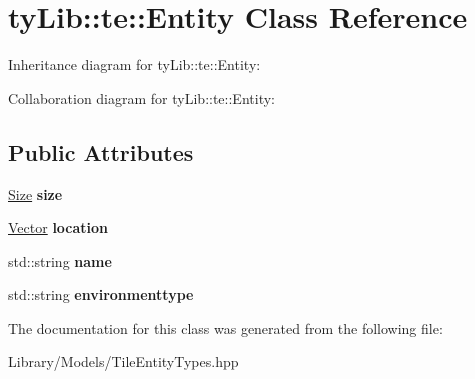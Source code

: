 \hypertarget{classty_lib_1_1te_1_1_entity}{}\section{ty\+Lib\+:\+:te\+:\+:Entity Class Reference}
\label{classty_lib_1_1te_1_1_entity}


Inheritance diagram for ty\+Lib\+:\+:te\+:\+:Entity\+:


Collaboration diagram for ty\+Lib\+:\+:te\+:\+:Entity\+:
\subsection*{Public Attributes}
\begin{DoxyCompactItemize}
\item 
\hypertarget{classty_lib_1_1te_1_1_entity_ab5a47dbb246efb4bc6677d9b0e339ded}{}\hyperlink{classty_lib_1_1_size}{Size} {\bfseries size}\label{classty_lib_1_1te_1_1_entity_ab5a47dbb246efb4bc6677d9b0e339ded}

\item 
\hypertarget{classty_lib_1_1te_1_1_entity_a150651afa46869c6a075aa5739af5fb9}{}\hyperlink{classty_lib_1_1_vector}{Vector} {\bfseries location}\label{classty_lib_1_1te_1_1_entity_a150651afa46869c6a075aa5739af5fb9}

\item 
\hypertarget{classty_lib_1_1te_1_1_entity_abe77506933cb27c6e0455aa92b18639b}{}std\+::string {\bfseries name}\label{classty_lib_1_1te_1_1_entity_abe77506933cb27c6e0455aa92b18639b}

\item 
\hypertarget{classty_lib_1_1te_1_1_entity_a446775fec41843b9a95bc4ab7283ef11}{}std\+::string {\bfseries environmenttype}\label{classty_lib_1_1te_1_1_entity_a446775fec41843b9a95bc4ab7283ef11}

\end{DoxyCompactItemize}


The documentation for this class was generated from the following file\+:\begin{DoxyCompactItemize}
\item 
Library/\+Models/Tile\+Entity\+Types.\+hpp\end{DoxyCompactItemize}
